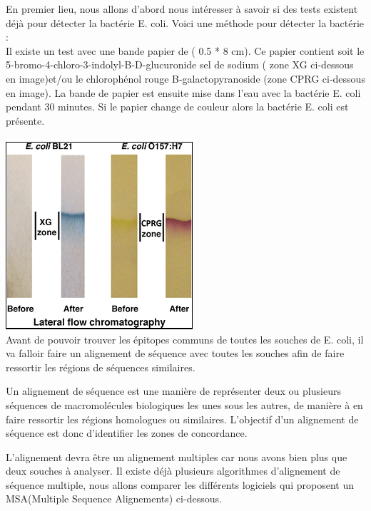 \documentclass{article}
\begin{document}
En premier lieu, nous allons d'abord nous intéresser à savoir si des tests existent déjà pour détecter la bactérie E. coli. Voici une méthode pour détecter la bactérie :\\
Il existe un test avec une bande papier de ( 0.5 * 8 cm). Ce papier contient soit le 5-bromo-4-chloro-3-indolyl-B-D-glucuronide sel de sodium ( zone XG ci-dessous en image)et/ou le chlorophénol rouge B-galactopyranoside (zone CPRG ci-dessous en image). La bande de papier est ensuite mise dans l'eau avec la bactérie E. coli pendant 30 minutes. Si le papier change de couleur alors la bactérie E. coli est présente.\\\\
  \includegraphics{img/ecoli.png}\\



Avant de pouvoir trouver les épitopes communs de toutes les souches de E. coli, il va falloir faire un alignement de séquence avec toutes les souches afin de faire ressortir les régions de séquences similaires.

Un alignement de séquence est une manière de représenter deux ou plusieurs séquences de macromolécules biologiques les unes sous les autres, de manière à en faire ressortir les régions homologues ou similaires. L'objectif d'un alignement de séquence est donc d'identifier les zones de concordance.

 L'alignement devra être un alignement multiples car nous avons bien plus que deux souches à analyser. Il existe déjà plusieurs algorithmes d'alignement de séquence multiple, nous allons comparer les différents logiciels qui proposent un MSA(Multiple Sequence Alignements) ci-dessous.
 
\end{document}
